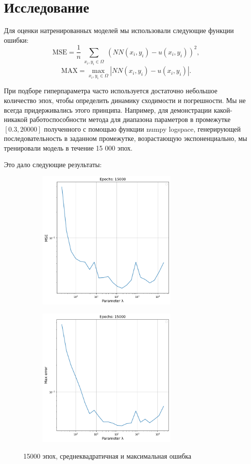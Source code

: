 \section{Исследование}

Для оценки натренированных моделей мы использовали следующие функции ошибки:
\[
    \text{MSE} = \frac{1}{n} \sum_{\substack{x_i, y_i \in \Omega }} \left( NN(x_i, y_i) - u(x_i, y_i) \right)^2,
\]
\[
    \text{MAX} = \max_{x_i,y_i \in \Omega} \left| NN(x_i, y_i) - u(x_i, y_i) \right|.
\]

При подборе гиперпараметра часто используется достаточно небольшое количество эпох, чтобы определить динамику сходимости и погрешности.
Мы не всегда придерживались этого принципа. Например, для демонстрации какой-никакой работоспособности метода для диапазона параметров
в промежутке $[0.3, 20000]$ полученного с помощью функции
\textrm{numpy logspace}, генерирующей последовательность в заданном промежутке, возрастающую экспоненциально, мы тренировали модель в течение
15 000 эпох.

Это дало следующие результаты:

\begin{figure}[htbt]
    \centering
    \begin{subfigure}{0.45\textwidth}{
        \includegraphics[height=7cm, keepaspectratio]{images/1.png}
    }
    \end{subfigure}
    \hfill
    \begin{subfigure}{0.45\textwidth}{
        \includegraphics[height=7cm, keepaspectratio]{images/2.png}
    }
    \end{subfigure}
    \caption{15000 эпох, среднеквадратичная и максимальная ошибка}
\end{figure}

